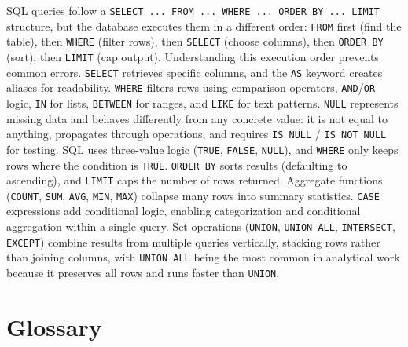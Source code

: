 \documentclass[
  letterpaper,
  DIV=11,
  numbers=noendperiod]{scrreprt}
\begin{document}
SQL queries follow a
\texttt{SELECT\ ...\ FROM\ ...\ WHERE\ ...\ ORDER\ BY\ ...\ LIMIT}
structure, but the database executes them in a different order:
\texttt{FROM} first (find the table), then \texttt{WHERE} (filter rows),
then \texttt{SELECT} (choose columns), then \texttt{ORDER\ BY} (sort),
then \texttt{LIMIT} (cap output). Understanding this execution order
prevents common errors. \texttt{SELECT} retrieves specific columns, and
the \texttt{AS} keyword creates aliases for readability. \texttt{WHERE}
filters rows using comparison operators, \texttt{AND}/\texttt{OR} logic,
\texttt{IN} for lists, \texttt{BETWEEN} for ranges, and \texttt{LIKE}
for text patterns. \texttt{NULL} represents missing data and behaves
differently from any concrete value: it is not equal to anything,
propagates through operations, and requires \texttt{IS\ NULL} /
\texttt{IS\ NOT\ NULL} for testing. SQL uses three-value logic
(\texttt{TRUE}, \texttt{FALSE}, \texttt{NULL}), and \texttt{WHERE} only
keeps rows where the condition is \texttt{TRUE}. \texttt{ORDER\ BY}
sorts results (defaulting to ascending), and \texttt{LIMIT} caps the
number of rows returned. Aggregate functions (\texttt{COUNT},
\texttt{SUM}, \texttt{AVG}, \texttt{MIN}, \texttt{MAX}) collapse many
rows into summary statistics. \texttt{CASE} expressions add conditional
logic, enabling categorization and conditional aggregation within a
single query. Set operations (\texttt{UNION}, \texttt{UNION\ ALL},
\texttt{INTERSECT}, \texttt{EXCEPT}) combine results from multiple
queries vertically, stacking rows rather than joining columns, with
\texttt{UNION\ ALL} being the most common in analytical work because it
preserves all rows and runs faster than \texttt{UNION}.

\section{Glossary}\label{glossary-6}
\end{document}
